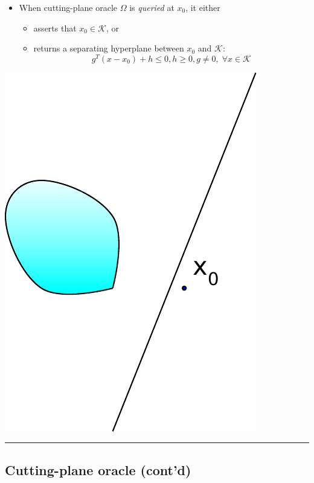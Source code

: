 \documentclass[]{article}
\providecommand{\tightlist}{%
  \setlength{\itemsep}{0pt}\setlength{\parskip}{0pt}}
\begin{document}
\begin{itemize}
\tightlist
\item
  When cutting-plane oracle \(\Omega\) is \emph{queried} at \(x_0\), it
  either

  \begin{itemize}
  \tightlist
  \item
    asserts that \(x_0 \in \mathcal{K}\), or
  \item
    returns a separating hyperplane between \(x_0\) and \(\mathcal{K}\):
    \[g^T (x - x_0) + h \leq 0, h \geq 0, g \neq 0, \;
          \forall x \in \mathcal{K}\]
  \end{itemize}
\end{itemize}

\includegraphics{ellipsoid.files/cut.pdf}

\begin{center}\rule{0.5\linewidth}{\linethickness}\end{center}

\hypertarget{cutting-plane-oracle-contd}{%
\subsection{Cutting-plane oracle
(cont'd)}\label{cutting-plane-oracle-contd}}
\end{document}
